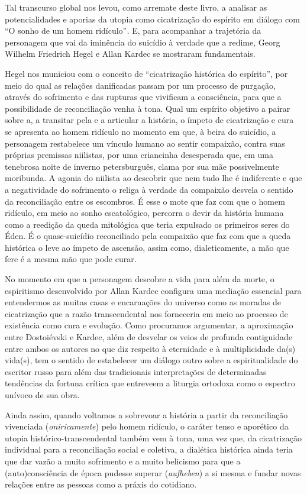 Tal transcurso global nos levou, como arremate deste livro, a analisar
as potencialidades e aporias da utopia como cicatrização do espírito em
diálogo com ``O sonho de um homem ridículo''\emph{.} E, para acompanhar
a trajetória da personagem que vai da iminência do suicídio à verdade
que a redime, Georg Wilhelm Friedrich Hegel e Allan Kardec se mostraram
fundamentais.

Hegel nos municiou com o conceito de ``cicatrização histórica do
espírito'', por meio do qual as relações danificadas passam por um
processo de purgação, através do sofrimento e das rupturas que vivificam
a consciência, para que a possibilidade de reconciliação venha à tona.
Qual um espírito objetivo a pairar sobre a, a transitar pela e a
articular a história, o ímpeto de cicatrização e cura se apresenta ao
homem ridículo no momento em que, à beira do suicídio, a personagem
restabelece um vínculo humano ao sentir compaixão, contra suas próprias
premissas niilistas, por uma criancinha desesperada que, em uma
tenebrosa noite de inverno petersburguês, clama por sua mãe
possivelmente moribunda. A agonia do niilista ao descobrir que nem tudo
lhe é indiferente e que a negatividade do sofrimento o religa à verdade
da compaixão desvela o sentido da reconciliação entre os escombros. É
esse o mote que faz com que o homem ridículo, em meio ao sonho
escatológico, percorra o devir da história humana como a reedição da
queda mitológica que teria expulsado os primeiros seres do Éden. É o
quase-suicídio reconciliado pela compaixão que faz com que a queda
histórica o leve ao ímpeto de ascensão, assim como, dialeticamente, a
mão que fere é a mesma mão que pode curar.

No momento em que a personagem descobre a vida para além da morte, o
espiritismo desenvolvido por Allan Kardec configura uma mediação
essencial para entendermos as muitas casas e encarnações do universo
como as moradas de cicatrização que a razão transcendental nos
forneceria em meio ao processo de existência como cura e evolução. Como
procuramos argumentar, a aproximação entre Dostoiévski e Kardec, além de
desvelar os veios de profunda contiguidade entre ambos os autores no que
diz respeito à eternidade e à multiplicidade da(s) vida(s), tem o
sentido de estabelecer um diálogo outro sobre a espiritualidade do
escritor russo para além das tradicionais interpretações de determinadas
tendências da fortuna crítica que entreveem a liturgia ortodoxa como o
espectro unívoco de sua obra.

Ainda assim, quando voltamos a sobrevoar a história a partir da
reconciliação vivenciada (\emph{oniricamente}) pelo homem ridículo, o
caráter tenso e aporético da utopia histórico-transcendental também vem
à tona, uma vez que, da cicatrização individual para a reconciliação
social e coletiva, a dialética histórica ainda teria que dar vazão a
muito sofrimento e a muito belicismo para que a (auto)consciência de
época pudesse superar (\emph{aufheben}) a si mesma e fundar novas
relações entre as pessoas como a práxis do cotidiano.

